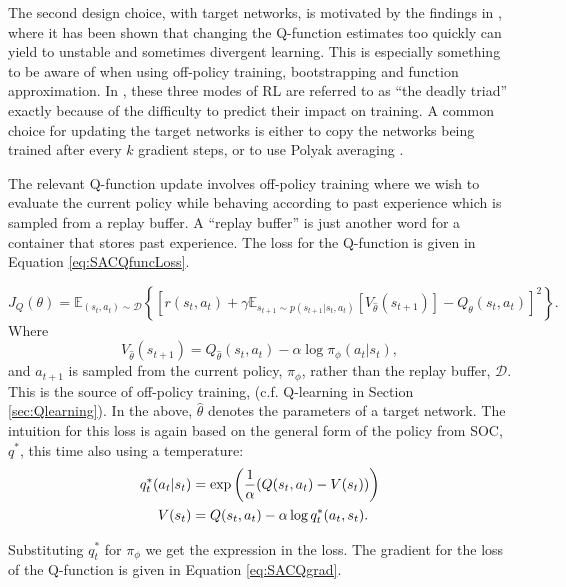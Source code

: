 \documentclass{report}
\numberwithin{equation}{section}
\numberwithin{figure}{section}
\numberwithin{table}{section}
\numberwithin{algorithm}{section}
\begin{document}
The second design choice, with target networks, 
is motivated by the findings in \cite{DQN}, 
where it has been shown that changing the Q-function estimates 
too quickly can yield to unstable and sometimes divergent learning. 
This is especially something to be aware of when using 
off-policy training, bootstrapping and function approximation.
In \cite{Sutton1998}, these three modes of RL are referred to 
as ``the deadly triad'' exactly because of the difficulty  
to predict their impact on training. A common choice for updating the 
target networks is either to copy the networks being trained 
after every $k$ gradient steps, or to use Polyak averaging 
\citep{PolyakAvg}.

The relevant Q-function update involves off-policy training 
where we wish to evaluate the current policy while behaving 
according to past experience which is sampled from a replay buffer. 
A ``replay buffer'' is just another word for a container that 
stores past experience. 
The loss for the Q-function is given in Equation 
\ref{eq:SACQfuncLoss}.

\begin{equation}\label{eq:SACQfuncLoss}
  J_Q(\theta)=\mathbb{E}_{(s_t,a_t)\sim \mathcal{D}}\left\{\left[
    r(s_t, a_t) 
    + \gamma \mathbb{E}_{s_{t+1}\sim p(s_{t+1}|s_t, a_t)}[V_{\hat{\theta}}(s_{t+1})]
    - Q_\theta(s_t,a_t)
  \right]^2\right\}.
\end{equation}
Where 
\begin{equation*}
  V_{\hat{\theta}}(s_{t+1})=Q_{\hat{\theta}}(s_t,a_t) - \alpha \log \pi_\phi(a_t|s_t),
\end{equation*}
and $a_{t+1}$ is sampled from the current policy, $\pi_\phi$, rather 
than the replay buffer, $\mathcal{D}$. This is the source of off-policy 
training, (c.f. Q-learning in Section \ref{sec:Qlearning}). In the above, 
$\hat{\theta}$ denotes the parameters of a target 
network. The intuition for this loss is again based on the 
general form of the policy from SOC, $q^*$, this time also using 
a temperature:
\begin{align}
  q_t^*(a_t|s_t)&=\exp\left(
    \frac{1}{\alpha}(Q(s_t,a_t) - V(s_t))
  \right)\notag\\
  V(s_t)&=Q(s_t,a_t) - \alpha \log q_t^*(a_t,s_t).
\end{align}

Substituting $q^*_t$ for $\pi_\phi$ we get the expression in the 
loss. The gradient for the loss of the Q-function is given in 
Equation \ref{eq:SACQgrad}.
\end{document}
